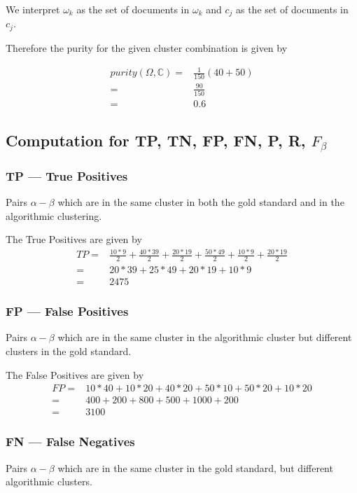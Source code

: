 \documentclass{article}
\begin{document}
We interpret $\omega_{k}$ as the set of documents in $\omega_{k}$ and $ c_{j} $ as the set of documents in $c_{j}$.

Therefore the purity for the given cluster combination is given by 

\begin{align*}
  purity(\Omega, \mathbb{C}) =& \frac{1}{150} ( 40 + 50 )\\
  =& \frac{90}{150}\\
  =& 0.6
\end{align*}

\subsection{Computation for TP, TN, FP, FN, P, R, $F_{\beta}$ }
\subsubsection{TP --- True Positives}
Pairs $ \alpha -  \beta $ which are in the same cluster in both the gold standard and in the algorithmic clustering.

The True Positives are given by 
\begin{align*}
  TP =& \frac{10 * 9}{2} + \frac{40 * 39}{2} + \frac{20 * 19}{2} + \frac{50 * 49}{2} + \frac{10 * 9}{2} + \frac{20 * 19}{2} \\
  =& 20*39 + 25*49 + 20*19 + 10*9 \\
  =& 2475
\end{align*}

\subsubsection{FP --- False Positives}
Pairs $ \alpha -  \beta $ which are in the same cluster in the algorithmic cluster but different clusters in the gold standard.

The False Positives are given by 
\begin{align*}
  FP =& 10*40 + 10*20 + 40*20 + 50*10 + 50*20 + 10*20 \\
  =& 400 + 200 + 800 + 500 + 1000 + 200 \\
  =& 3100
\end{align*}

\subsubsection{FN --- False Negatives}
Pairs $ \alpha -  \beta $ which are in the same cluster in the gold standard, but different algorithmic clusters.
\end{document}
